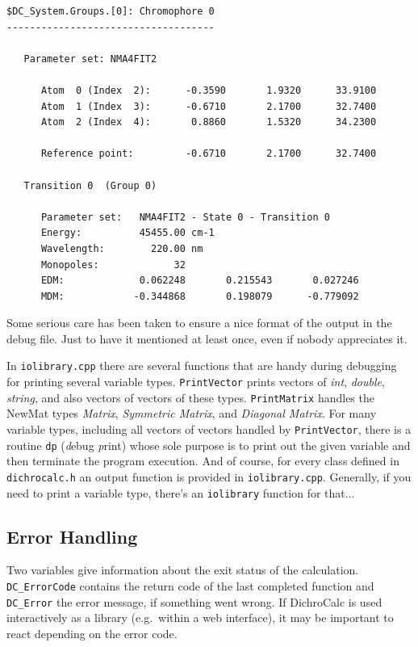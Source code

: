 \documentclass[11pt, letterpaper]{article}
\begin{document}
\begin{verbatim}
$DC_System.Groups.[0]: Chromophore 0
------------------------------------

   Parameter set: NMA4FIT2

      Atom  0 (Index  2):      -0.3590       1.9320      33.9100
      Atom  1 (Index  3):      -0.6710       2.1700      32.7400
      Atom  2 (Index  4):       0.8860       1.5320      34.2300

      Reference point:         -0.6710       2.1700      32.7400

   Transition 0  (Group 0)

      Parameter set:   NMA4FIT2 - State 0 - Transition 0
      Energy:          45455.00 cm-1
      Wavelength:        220.00 nm
      Monopoles:             32
      EDM:             0.062248       0.215543       0.027246
      MDM:            -0.344868       0.198079      -0.779092
\end{verbatim}

Some serious care has been taken to ensure a nice format of the output in the debug file. Just to have it mentioned at least once, even if nobody appreciates it.

In \verb'iolibrary.cpp' there are several functions that are handy during debugging for printing several variable types. \verb'PrintVector' prints vectors of \emph{int}, \emph{double}, \emph{string}, and also vectors of vectors of these types. \verb'PrintMatrix' handles the NewMat types \emph{Matrix}, \emph{Symmetric Matrix}, and \emph{Diagonal Matrix}. For many variable types, including all vectors of vectors handled by \verb'PrintVector', there is a routine \verb'dp' (\emph{d}ebug \emph{p}rint) whose sole purpose is to print out the given variable and then terminate the program execution. And of course, for every class defined in \verb'dichrocalc.h' an output function is provided in \verb'iolibrary.cpp'. Generally, if you need to print a variable type, there's an \verb'iolibrary' function for that...



\subsection{Error Handling}

Two variables give information about the exit status of the calculation. \verb'DC_ErrorCode' contains the return code of the last completed function and \verb'DC_Error' the error message, if something went wrong. If DichroCalc is used interactively as a library (e.g.\ within a web interface), it may be important to react depending on the error code.
\end{document}
